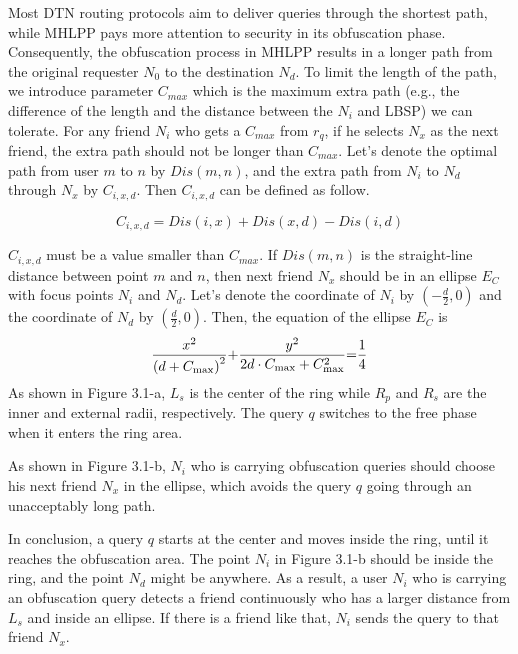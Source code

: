 Most DTN routing protocols aim to deliver queries through the shortest path, while MHLPP pays more attention to security in its obfuscation phase. Consequently, the obfuscation process in MHLPP results in a longer path from the original requester ${N}_{0}$ to the destination ${N}_{d}$. To limit the length of the path, we introduce parameter ${C}_{max}$ which is the maximum extra path (e.g., the difference of the length and the distance between the ${N}_{i}$ and LBSP) we can tolerate. For any friend ${N}_{i}$ who gets a ${C}_{max}$ from ${r}_{q}$, if he selects ${N}_{x}$ as the next friend, the extra path should not be longer than ${C}_{max}$. Let's denote the optimal path from user $m$ to $n$ by ${Dis}\left (m,n\right )$, and the extra path from ${N}_{i}$ to ${N}_{d}$ through ${N}_{x}$ by ${C}_{i,x,d}$. Then ${C}_{i,x,d}$ can be defined as follow.

\begin{equation} \label{GrindEQ__1_} 
C_{i,x,d} =Dis(i,x)+Dis(x,d)-Dis(i,d) 
\end{equation} 

${C}_{i,x,d}$ must be a value smaller than ${C}_{max}$. If ${Dis}\left (m,n\right )$ is the straight-line distance between point $m$ and $n$, then next friend ${N}_{x}$ should be in an ellipse ${E}_{C}$ with focus points ${N}_{i}$ and ${N}_{d}$. Let's denote the coordinate of ${N}_{i}$ by $\left(-\frac{d}{2} ,0\right)$ and the coordinate of ${N}_{d}$ by $\left(\frac{d}{2} ,0\right)$. Then, the equation of the ellipse ${E}_{C}$ is
\begin{equation} \label{GrindEQ__2_} 
\frac{x^{2} }{\left(d+C_{\max } \right)^{2} } {\rm +}\frac{y^{2} }{2d\cdot C_{\max } +C_{\max }^{2} } {\rm =}\frac{1}{4}  
\end{equation} 
As shown in Figure 3.1-a, ${L}_{s}$ is the center of the ring while ${R}_{p}$ and ${R}_{s}$ are the inner and external radii, respectively. The query $q$ switches to the free phase when it enters the ring area. 

\noindent As shown in Figure 3.1-b, ${N}_{i}$ who is carrying obfuscation queries should choose his next friend ${N}_{x}$ in the ellipse, which avoids the query $q$ going through an unacceptably long path.

\noindent In conclusion, a query $q$ starts at the center and moves inside the ring, until it reaches the obfuscation area. The point ${N}_{i}$ in Figure 3.1-b should be inside the ring, and the point ${N}_{d}$ might be anywhere. As a result, a user ${N}_{i}$ who is carrying an obfuscation query detects a friend continuously who has a larger distance from ${L}_{s}$ and inside an ellipse. If there is a friend like that, ${N}_{i}$ sends the query to that friend ${N}_{x}$.

